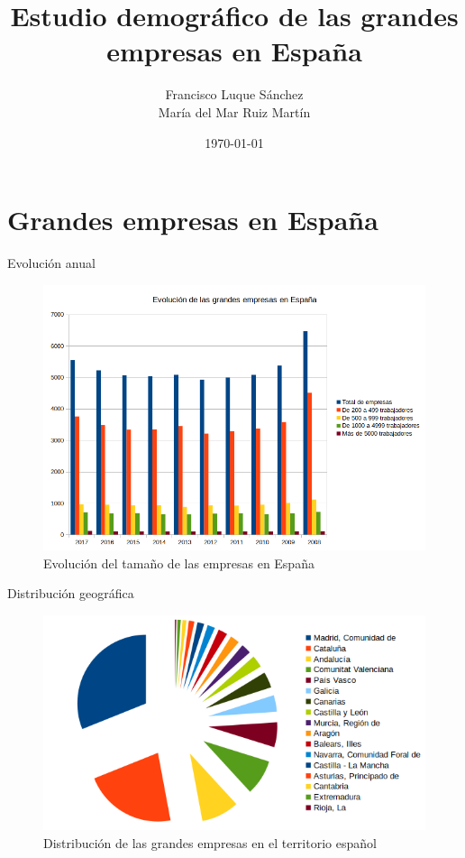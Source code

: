 \documentclass{beamer}
\title{Estudio demográfico de las grandes empresas en España}
\date{\today}
\author{Francisco Luque Sánchez\\
María del Mar Ruiz Martín}
\institute{Ingeniería, empresa y sociedad}
\begin{document}
\maketitle

\section{Grandes empresas en España}

\begin{frame}{Evolución anual}
  \begin{figure}[H]
    \centering
    \includegraphics[width=.8\textwidth]{../graficos/barras_evolucion_anual}
    \caption{Evolución del tamaño de las empresas en España}
  \end{figure}
\end{frame}

\begin{frame}{Distribución geográfica}
  \begin{figure}[H]
    \centering
    \includegraphics[width=.9\textwidth]{../graficos/sectores_comunidades}
    \caption{Distribución de las grandes empresas en el territorio
      español}
  \end{figure}
\end{frame}
\end{document}
